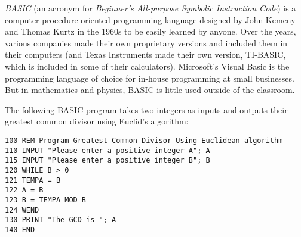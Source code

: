 \documentclass[12pt]{article}
\begin{document}

{\em BASIC} (an acronym for {\em Beginner's All-purpose Symbolic Instruction Code}) is a computer procedure-oriented programming language designed by John Kemeny and Thomas Kurtz in the 1960s to be easily learned by anyone. Over the years, various companies made their own proprietary versions and included them in their computers (and  Texas Instruments made their own version, TI-BASIC, which is included in some of their calculators). Microsoft's Visual Basic is the programming language of choice for in-house programming at small businesses. But in mathematics and physics, BASIC is little used outside of the classroom.

The following BASIC program takes two integers as inputs and outputs their greatest common divisor using Euclid's algorithm:

\begin{verbatim}
100 REM Program Greatest Common Divisor Using Euclidean algorithm
110 INPUT "Please enter a positive integer A"; A
115 INPUT "Please enter a positive integer B"; B
120 WHILE B > 0
121 TEMPA = B
122 A = B
123 B = TEMPA MOD B
124 WEND
130 PRINT "The GCD is "; A
140 END

\end{verbatim}
\end{document}
